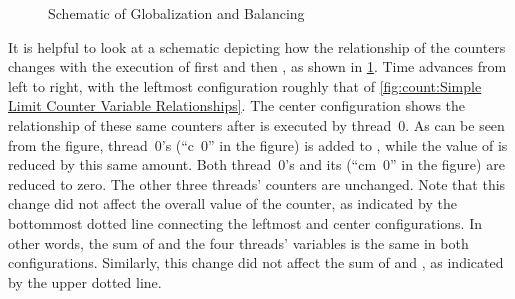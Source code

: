 \QuickQuizEnd

\begin{figure}
\centering
{}
\caption{Schematic of Globalization and Balancing}
\label{fig:count:Schematic of Globalization and Balancing}
\end{figure}

It is helpful to look at a schematic depicting how the relationship
of the counters changes with the execution of first
 and then , as shown in
\cref{fig:count:Schematic of Globalization and Balancing}.
Time advances from left to right, with the leftmost configuration
roughly that of
\cref{fig:count:Simple Limit Counter Variable Relationships}.
The center configuration shows the relationship of these same counters
after  is executed by thread~0.
As can be seen from the figure, thread~0's  (``c~0'' in
the figure) is added to , while the value of
 is reduced by this same amount.
Both thread~0's  and its 
(``cm~0'' in the figure) are reduced to zero.
The other three threads' counters are unchanged.
Note that this change did not affect the overall value of the counter,
as indicated by the bottommost dotted line connecting the leftmost
and center configurations.
In other words, the sum of  and the four threads'
 variables is the same in both configurations.
Similarly, this change did not affect the sum of  and
, as indicated by the upper dotted line.


